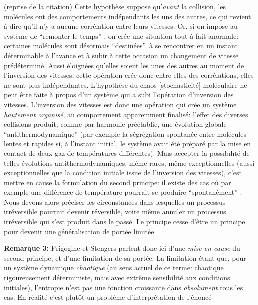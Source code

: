 {\cit  \noindent (reprise de la citation) Cette hypoth\`ese suppose
qu'{\it avant} la collision, les mol\'ecules ont des comportements 
ind\'ependants les uns des autres, ce qui revient \`a dire qu'il n'y a 
aucune corr\'elation entre leurs vitesses. Or, si on impose au syst\`eme 
de ``{remonter le temps}'' , on cr\'ee une situation tout \`a fait
anormale: certaines mol\'ecules sont d\'esormais ``{destin\'ees}''\
\`a se rencontrer en un instant d\'eterminable \`a l'avance et \`a subir 
\`a cette occasion un changement de vitesse pr\'ed\'etermin\'e. Aussi 
\'eloign\'ees qu'elles soient les unes des autres au moment de l'inversion 
des vitesses, cette op\'eration cr\'ee donc entre elles des corr\'elations, 
elles ne sont plus ind\'ependantes. L'hypoth\`ese du chaos 
[stochasticit\'e] mol\'eculaire ne peut \^etre faite \`a propos 
d'un syst\`eme qui a subi l'op\'eration d'inversion des vitesses.
\smallskip
L'inversion des vitesses est donc une op\'eration qui cr\'ee un syst\`eme 
{\it hautement organis\'e}, au comportement apparemment finalis\'e: 
l'effet des diverses collisions produit, comme par harmonie pr\'e\'etablie, 
une \'evolution globale ``{antithermodynamique}'' (par exemple la
s\'egr\'egation spontan\'ee entre mol\'ecules lentes et rapides si, 
\`a l'instant initial, le syst\`eme avait \'et\'e pr\'epar\'e par la mise
en contact de deux gaz de temp\'eratures diff\'erentes). Mais accepter la 
possibilit\'e de telles \'evolutions antithermodynamiques, m\^eme rares, 
m\^eme exceptionnelles (aussi exceptionnelles que la condition initiale 
issue de l'inversion des vitesses), c'est mettre en cause la formulation 
du second principe: il existe des cas o\`u par exem\-ple une diff\'erence 
de temp\'erature pourrait se produire ``{spontan\'ement}'' . Nous
devons alors pr\'eciser les circonstances dans lesquelles un processus 
irr\'eversible pourrait devenir r\'eversible, voire m\^eme annuler un 
processus irr\'eversible qui s'est produit dans le pass\'e. Le principe 
cesse d'\^etre un principe pour devenir une g\'en\'eralisation de port\'ee 
limit\'ee. \par  }
\medskip
{\bf Remarque 3:} Prigogine et Stengers parlent donc ici d'une {\it mise 
en cause} du second principe, et d'une limitation de sa port\'ee. 
La limitation \'etant que, pour un syst\`eme dynamique {\it chaotique} 
(au sens actuel de ce terme: chaotique = rigoureusement d\'eterministe, 
mais avec extr\^eme sensibilit\'e aux conditions initiales), l'entropie 
n'est pas une fonction croissante dans {\it absolument} tous les cas. En 
r\'ealit\'e c'est plut\^ot un probl\`eme d'interpr\'etation de l'\'enonc\'e 
